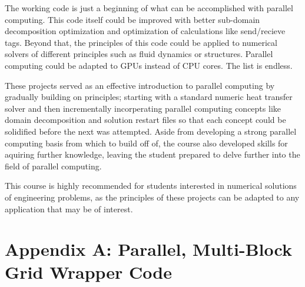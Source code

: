 \documentclass[twocolumn,10pt]{asme2ej}
\begin{document}
The working code is just a beginning of what can be accomplished with parallel computing.  This code itself could be improved with better sub-domain decomposition optimization and optimization of calculations like send/recieve tags.  Beyond that, the principles of this code could be applied to numerical solvers of different principles such as fluid dynamics or structures.  Parallel computing could be adapted to GPUs instead of CPU cores.  The list is endless.

These projects served as an effective introduction to parallel computing by gradually building on principles; starting with a standard numeric heat transfer solver and then incrementally incorperating parallel computing concepts like domain decomposition and solution restart files so that each concept could be solidified before the next was attempted.  Aside from developing a strong parallel computing basis from which to build off of, the course also developed skills for aquiring further knowledge, leaving the student prepared to delve further into the field of parallel computing.

This course is highly recommended for students interested in numerical solutions of engineering problems, as the principles of these projects can be adapted to any application that may be of interest.









\onecolumn
\appendix       %

\section*{Appendix A: Parallel, Multi-Block Grid Wrapper Code}

\end{document}
